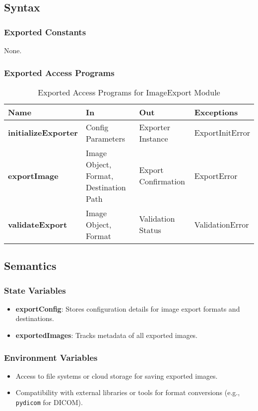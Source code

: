 \documentclass[12pt, titlepage]{article}
\begin{document}
\subsection{Syntax}

\subsubsection{Exported Constants}
None.

\subsubsection{Exported Access Programs}

\begin{table}[h!]
\centering
\begin{tabular}{|p{4cm}|p{5cm}|p{5cm}|p{4cm}|}
    \hline
    \textbf{Name} & \textbf{In} & \textbf{Out} & \textbf{Exceptions} \\
    \hline
    \textbf{initializeExporter} & Config Parameters & Exporter Instance & ExportInitError \\
    \hline
    \textbf{exportImage} & Image Object, Format, Destination Path & Export Confirmation & ExportError \\
    \hline
    \textbf{validateExport} & Image Object, Format & Validation Status & ValidationError \\
    \hline
\end{tabular}
\caption{Exported Access Programs for ImageExport Module}
\label{table:imageExport}
\end{table}

\subsection{Semantics}

\subsubsection{State Variables}
\begin{itemize}
    \item \textbf{exportConfig}: Stores configuration details for image export formats and destinations.
    \item \textbf{exportedImages}: Tracks metadata of all exported images.
\end{itemize}

\subsubsection{Environment Variables}
\begin{itemize}
    \item Access to file systems or cloud storage for saving exported images.
    \item Compatibility with external libraries or tools for format conversions (e.g., \texttt{pydicom} for DICOM).
\end{itemize}
\end{document}
